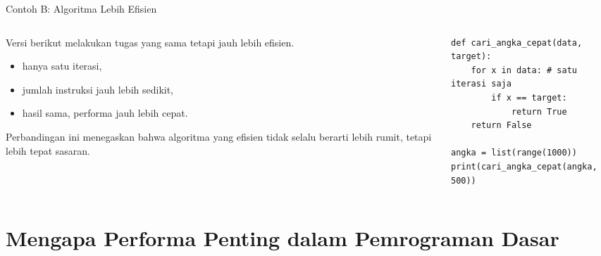 \documentclass[aspectratio=169, table]{beamer}
\begin{document}
\begin{frame}[fragile]{Contoh B: Algoritma Lebih Efisien}
\vspace{8pt}

\begin{columns}[T]
\begin{column}{0.45\linewidth}
Versi berikut melakukan tugas yang sama tetapi jauh lebih efisien.

\begin{itemize}
    \item hanya satu iterasi,
    \item jumlah instruksi jauh lebih sedikit,
    \item hasil sama, performa jauh lebih cepat.
\end{itemize}

Perbandingan ini menegaskan bahwa algoritma yang efisien
tidak selalu berarti lebih rumit, tetapi lebih tepat sasaran.
\end{column}

\begin{column}{0.52\linewidth}
\begin{lstlisting}[style=PythonStyle, basicstyle=\ttfamily\scriptsize]
def cari_angka_cepat(data, target):
    for x in data: # satu iterasi saja
        if x == target:
            return True
    return False

angka = list(range(1000))
print(cari_angka_cepat(angka, 500))
\end{lstlisting}
\end{column}
\end{columns}

\end{frame}


\section{Mengapa Performa Penting dalam Pemrograman Dasar}
\end{document}
